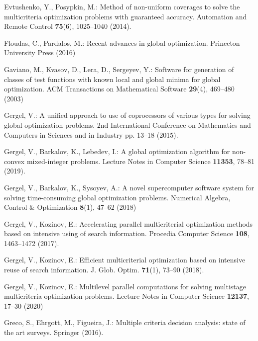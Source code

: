 \documentclass{svproc}
\begin{document}
\begin{thebibliography}{10}
Evtushenko, Y., Posypkin, M.: Method of non-uniform coverages to solve the
  multicriteria optimization problems with guaranteed accuracy.
\newblock Automation and Remote Control \textbf{75}(6), 1025--1040 (2014).
\newblock {}

Floudas, C., Pardalos, M.: Recent advances in global optimization.
\newblock Princeton University Press (2016)

Gaviano, M., Kvasov, D., Lera, D., Sergeyev, Y.: Software for generation of
  classes of test functions with known local and global minima for global
  optimization.
\newblock ACM Transactions on Mathematical Software \textbf{29}(4), 469--480
  (2003)

Gergel, V.: A unified approach to use of coprocessors of various types for
  solving global optimization problems.
\newblock 2nd International Conference on Mathematics and Computers in Sciences
  and in Industry pp. 13--18 (2015).
\newblock {}

Gergel, V., Barkalov, K., Lebedev, I.: A global optimization algorithm for
  non-convex mixed-integer problems.
\newblock Lecture Notes in Computer Science \textbf{11353}, 78--81 (2019).
\newblock {}

Gergel, V., Barkalov, K., Sysoyev, A.: A novel supercomputer software system
  for solving time-consuming global optimization problems.
\newblock Numerical Algebra, Control \& Optimization \textbf{8}(1), 47--62
  (2018)

Gergel, V., Kozinov, E.: Accelerating parallel multicriterial optimization
  methods based on intensive using of search information.
\newblock Procedia Computer Science \textbf{108}, 1463--1472 (2017).
\newblock {}

Gergel, V., Kozinov, E.: Efficient multicriterial optimization based on
  intensive reuse of search information.
\newblock J. Glob. Optim. \textbf{71}(1), 73--90 (2018).
\newblock {}

Gergel, V., Kozinov, E.: Multilevel parallel computations for solving
  multistage multicriteria optimization problems.
\newblock Lecture Notes in Computer Science \textbf{12137}, 17--30 (2020)

Greco, S., Ehrgott, M., Figueira, J.: Multiple criteria decision analysis:
  state of the art surveys.
\newblock Springer (2016).
\newblock {}


\end{thebibliography}
\end{document}
